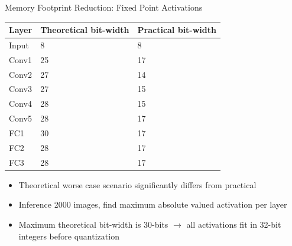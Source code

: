\begin{frame}{Memory Footprint Reduction: Fixed Point Activations}
	\begin{minipage}{0.6\textwidth}
		\centering
		\begin{table}[H]
			\centering
			\begin{tabular}{lp{2cm}p{2cm}}
				\toprule
				\textbf{Layer} & \textbf{Theoretical bit-width} & \textbf{Practical bit-width} \\
				\midrule
				Input          & 8                              & 8                            \\
				Conv1          & 25                             & 17                           \\
				Conv2          & 27                             & 14                           \\
				Conv3          & 27                             & 15                           \\
				Conv4          & 28                             & 15                           \\
				Conv5          & 28                             & 17                           \\
				FC1            & 30                             & 17                           \\
				FC2            & 28                             & 17                           \\
				FC3            & 28                             & 17                           \\
				\bottomrule
			\end{tabular}
		\end{table}
	\end{minipage}%
	\begin{minipage}{0.4\textwidth}
		\begin{itemize}
			\item Theoretical worse case scenario significantly differs from practical
			\item Inference 2000 images, find maximum absolute valued activation per layer
			\item Maximum theoretical bit-width is 30-bits $\rightarrow$ all activations fit in 32-bit integers before quantization
		\end{itemize}
	\end{minipage}
\end{frame}

